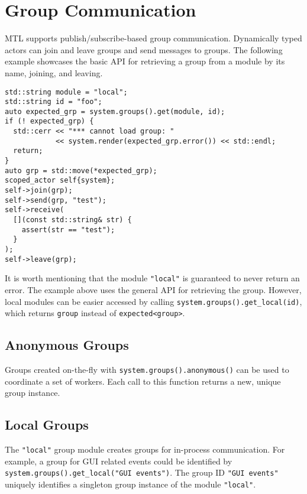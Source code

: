 \section{Group Communication}
\label{groups}

MTL supports publish/subscribe-based group communication. Dynamically typed
actors can join and leave groups and send messages to groups. The following
example showcases the basic API for retrieving a group from a module by its
name, joining, and leaving.

\begin{lstlisting}
std::string module = "local";
std::string id = "foo";
auto expected_grp = system.groups().get(module, id);
if (! expected_grp) {
  std::cerr << "*** cannot load group: "
            << system.render(expected_grp.error()) << std::endl;
  return;
}
auto grp = std::move(*expected_grp);
scoped_actor self{system};
self->join(grp);
self->send(grp, "test");
self->receive(
  [](const std::string& str) {
    assert(str == "test");
  }
);
self->leave(grp);
\end{lstlisting}

It is worth mentioning that the module \lstinline`"local"` is guaranteed to
never return an error. The example above uses the general API for retrieving
the group. However, local modules can be easier accessed by calling
\lstinline`system.groups().get_local(id)`, which returns \lstinline`group`
instead of \lstinline`expected<group>`.

\subsection{Anonymous Groups}
\label{anonymous-group}

Groups created on-the-fly with \lstinline^system.groups().anonymous()^ can be
used to coordinate a set of workers. Each call to this function returns a new,
unique group instance.

\subsection{Local Groups}
\label{local-group}

The \lstinline^"local"^ group module creates groups for in-process
communication. For example, a group for GUI related events could be identified
by \lstinline^system.groups().get_local("GUI events")^. The group ID
\lstinline^"GUI events"^ uniquely identifies a singleton group instance of the
module \lstinline^"local"^.

